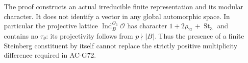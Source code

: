 \begin{remark}
The proof constructs an actual irreducible finite representation
and its modular character.  It does not identify a vector in any
global automorphic space.  In particular the projective lattice
$\operatorname{Ind}_{B}^{G_3}\mathcal O$ has
character $1+2\rho_{21}+\operatorname{St}_3$ and contains no
$\tau_\theta$: its projectivity follows from $p\nmid |B|$.
Thus the presence of a finite Steinberg constituent by itself
cannot replace the strictly positive multiplicity difference
required in AC-G72.
\end{remark}
